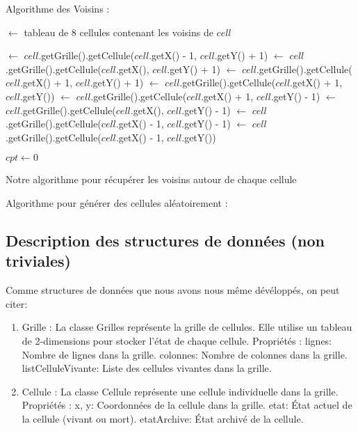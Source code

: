 Algorithme des Voisins :\newline \newline \newline \newline \newline \newline \newline \newline 

\begin{algorithm}
  \SetAlgoLined

  \voisins $\gets$ tableau de 8 cellules contenant les voisins de $cell$\;
  
  \voisins[0] $\gets$ $cell$.getGrille().getCellule($cell$.getX() - 1, $cell$.getY() + 1)\;
  \voisins[1] $\gets$ $cell$.getGrille().getCellule($cell$.getX(), $cell$.getY() + 1)\;
  \voisins[2] $\gets$ $cell$.getGrille().getCellule($cell$.getX() + 1, $cell$.getY() + 1)\;
  \voisins[3] $\gets$ $cell$.getGrille().getCellule($cell$.getX() + 1, $cell$.getY())\;
  \voisins[4] $\gets$ $cell$.getGrille().getCellule($cell$.getX() + 1, $cell$.getY() - 1)\;
  \voisins[5] $\gets$ $cell$.getGrille().getCellule($cell$.getX(), $cell$.getY() - 1)\;
  \voisins[6] $\gets$ $cell$.getGrille().getCellule($cell$.getX() - 1, $cell$.getY() - 1)\;
  \voisins[7] $\gets$ $cell$.getGrille().getCellule($cell$.getX() - 1, $cell$.getY())\;

  $cpt \gets 0$\;
  
  \;

  \caption{Notre algorithme pour récupérer les voisins autour de chaque cellule}
\end{algorithm}


Algorithme pour générer des cellules aléatoirement : 



\subsection{Description des structures de données (non triviales)}
    Comme structures de données que nous avons nous même dévéloppés, on peut citer: 
   \begin{enumerate}
       \item Grille : La classe Grilles représente la grille de cellules. Elle utilise un tableau de 2-dimensions pour stocker l'état de chaque cellule.
Propriétés :
lignes: Nombre de lignes dans la grille.
colonnes: Nombre de colonnes dans la grille.
listCelluleVivante: Liste des cellules vivantes dans la grille.

\item Cellule : La classe Cellule représente une cellule individuelle dans la grille.
Propriétés : x, y: Coordonnées de la cellule dans la grille.
etat: État actuel de la cellule (vivant ou mort).
etatArchive: État archivé de la cellule.
   \end{enumerate}
   


